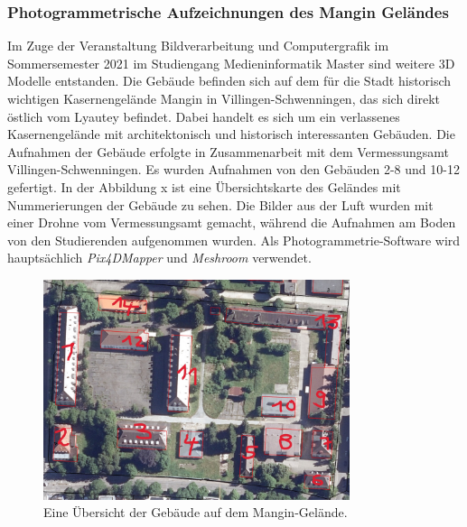 \subsubsection{Photogrammetrische Aufzeichnungen des Mangin Geländes}
Im Zuge der Veranstaltung Bildverarbeitung und Computergrafik im Sommersemester 2021 im Studiengang Medieninformatik Master sind weitere 3D Modelle entstanden\cite{kusch2021}. Die Gebäude befinden sich auf dem für die Stadt historisch wichtigen Kasernengelände Mangin in Villingen-Schwenningen, das sich direkt östlich vom Lyautey befindet. Dabei handelt es sich um ein verlassenes Kasernengelände mit architektonisch und historisch interessanten Gebäuden. Die Aufnahmen der Gebäude erfolgte in Zusammenarbeit mit dem Vermessungsamt Villingen-Schwenningen. Es wurden Aufnahmen von den Gebäuden 2-8 und 10-12 gefertigt. In der Abbildung x ist eine Übersichtskarte des Geländes mit Nummerierungen der Gebäude zu sehen.  Die Bilder aus der Luft wurden mit einer Drohne vom Vermessungsamt gemacht, während die Aufnahmen am Boden von den Studierenden aufgenommen wurden. Als Photogrammetrie-Software wird hauptsächlich \textit{Pix4DMapper} und \textit{Meshroom} verwendet. 

\begin{figure}[h]
    \centering
    \includegraphics[width=0.8\textwidth]{img/vorangegangene_Projekte/mangin_map.jpg}
    \caption{Eine Übersicht der Gebäude auf dem Mangin-Gelände.}
    \label{fig:mangin-map}
\end{figure}
